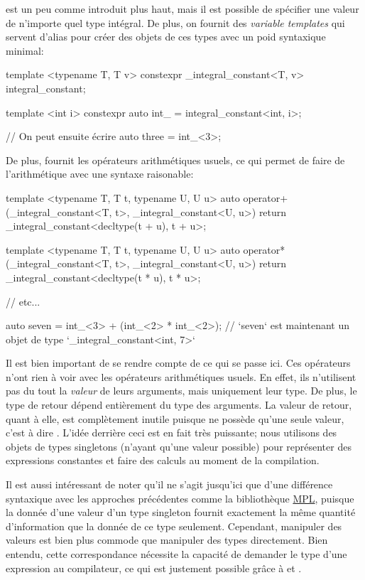  est un peu comme  introduit plus haut,
mais il est possible de spécifier une valeur de n'importe quel type intégral.
De plus, on fournit des \textit{variable templates} qui servent d'alias pour
créer des objets de ces types avec un poid syntaxique minimal:
\begin{cpp}
    template <typename T, T v>
    constexpr _integral_constant<T, v> integral_constant{};

    template <int i>
    constexpr auto int_ = integral_constant<int, i>;

    // On peut ensuite écrire
    auto three = int_<3>;
\end{cpp}

De plus,  fournit les opérateurs arithmétiques usuels,
ce qui permet de faire de l'arithmétique avec une syntaxe raisonable:
\begin{cpp}
    template <typename T, T t, typename U, U u>
    auto operator+(_integral_constant<T, t>, _integral_constant<U, u>)
    { return _integral_constant<decltype(t + u), t + u>{}; }

    template <typename T, T t, typename U, U u>
    auto operator*(_integral_constant<T, t>, _integral_constant<U, u>)
    { return _integral_constant<decltype(t * u), t * u>{}; }

    // etc...

    auto seven = int_<3> + (int_<2> * int_<2>);
    // `seven` est maintenant un objet de type `_integral_constant<int, 7>`
\end{cpp}

Il est bien important de se rendre compte de ce qui se passe ici. Ces opérateurs
n'ont rien à voir avec les opérateurs arithmétiques usuels. En effet, ils
n'utilisent pas du tout la \textit{valeur} de leurs arguments, mais uniquement
leur type. De plus, le type de retour dépend entièrement du type des arguments.
La valeur de retour, quant à elle, est complètement inutile puisque
 ne possède qu'une seule valeur, c'est à dire
. L'idée derrière ceci est en fait très
puissante; nous utilisons des objets de types singletons (n'ayant qu'une
valeur possible) pour représenter des expressions constantes et faire des
calculs au moment de la compilation.

Il est aussi intéressant de noter qu'il ne s'agit jusqu'ici que d'une différence
syntaxique avec les approches précédentes comme la bibliothèque \href{\MPL}{MPL},
puisque la donnée d'une valeur d'un type singleton fournit exactement la même
quantité d'information que la donnée de ce type seulement. Cependant, manipuler
des valeurs est bien plus commode que manipuler des types directement. Bien
entendu, cette correspondance nécessite la capacité de demander le type d'une
expression au compilateur, ce qui est justement possible grâce à 
et .


